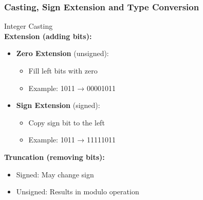 \subsubsection{Casting, Sign Extension and Type Conversion}

\begin{definition}{Integer Casting}\\
\textbf{Extension (adding bits):}

\begin{minipage}{0.5\textwidth}
\begin{itemize}
  \item \textbf{Zero Extension} (unsigned):
    \begin{itemize}
      \item Fill left bits with zero
      \item Example: 1011 → 00001011
    \end{itemize}
\end{itemize}
\end{minipage}
\begin{minipage}{0.5\textwidth}
\begin{itemize}
  \item \textbf{Sign Extension} (signed):
    \begin{itemize}
      \item Copy sign bit to the left
      \item Example: 1011 → 11111011
    \end{itemize}
\end{itemize}
\end{minipage}

\textbf{Truncation (removing bits):}
\begin{itemize}
  \item Signed: May change sign
  \item Unsigned: Results in modulo operation
\end{itemize}
\end{definition}




